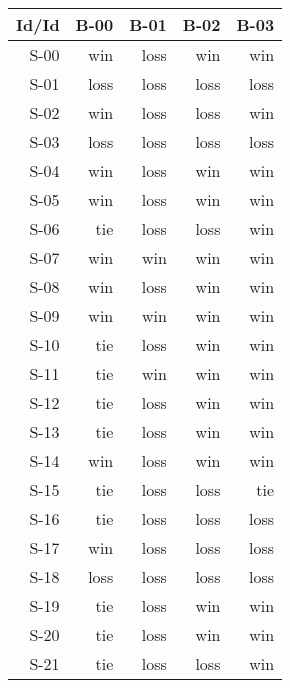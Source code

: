 \begin{tabular}{ | r | r | r | r | r | }
    \hline
        Id/Id  &   B-00  &   B-01  &   B-02  &   B-03  \\
    \hline
    \hline
         S-00  &    win  &   loss  &    win  &    win  \\
    \hline
         S-01  &   loss  &   loss  &   loss  &   loss  \\
    \hline
         S-02  &    win  &   loss  &   loss  &    win  \\
    \hline
         S-03  &   loss  &   loss  &   loss  &   loss  \\
    \hline
         S-04  &    win  &   loss  &    win  &    win  \\
    \hline
         S-05  &    win  &   loss  &    win  &    win  \\
    \hline
         S-06  &    tie  &   loss  &   loss  &    win  \\
    \hline
         S-07  &    win  &    win  &    win  &    win  \\
    \hline
         S-08  &    win  &   loss  &    win  &    win  \\
    \hline
         S-09  &    win  &    win  &    win  &    win  \\
    \hline
         S-10  &    tie  &   loss  &    win  &    win  \\
    \hline
         S-11  &    tie  &    win  &    win  &    win  \\
    \hline
         S-12  &    tie  &   loss  &    win  &    win  \\
    \hline
         S-13  &    tie  &   loss  &    win  &    win  \\
    \hline
         S-14  &    win  &   loss  &    win  &    win  \\
    \hline
         S-15  &    tie  &   loss  &   loss  &    tie  \\
    \hline
         S-16  &    tie  &   loss  &   loss  &   loss  \\
    \hline
         S-17  &    win  &   loss  &   loss  &   loss  \\
    \hline
         S-18  &   loss  &   loss  &   loss  &   loss  \\
    \hline
         S-19  &    tie  &   loss  &    win  &    win  \\
    \hline
         S-20  &    tie  &   loss  &    win  &    win  \\
    \hline
         S-21  &    tie  &   loss  &   loss  &    win  \\

\end{tabular}
